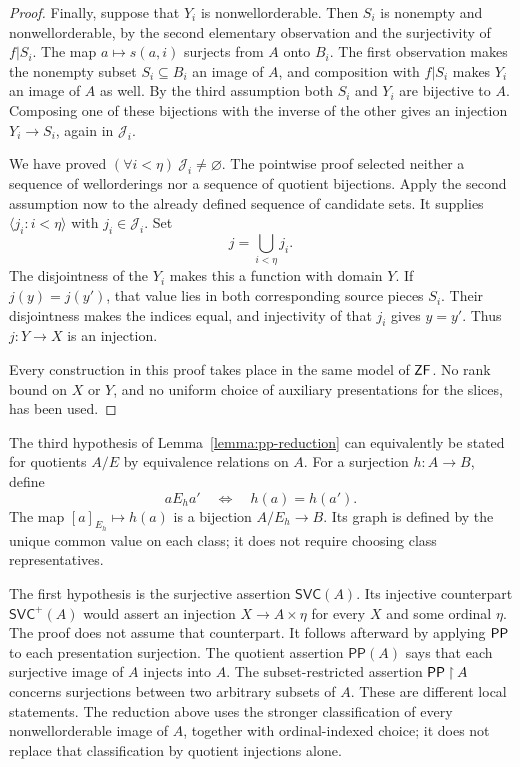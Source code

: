 \begin{proof}
Finally, suppose that $Y_i$ is nonwellorderable.  Then $S_i$ is
nonempty and nonwellorderable, by the second elementary observation
and the surjectivity of $f|S_i$.  The map $a\mapsto s(a,i)$
surjects from $A$ onto $B_i$.  The first observation makes the
nonempty subset $S_i\subseteq B_i$ an image of $A$, and composition
with $f|S_i$ makes $Y_i$ an image of $A$ as well.  By the third
assumption both $S_i$ and $Y_i$ are bijective to $A$.  Composing
one of these bijections with the inverse of the other gives an
injection $Y_i\longrightarrow S_i$, again in $\mathcal J_i$.

We have proved $(\forall i<\eta)\ \mathcal J_i\ne\varnothing$.
The pointwise proof selected neither a sequence of wellorderings nor
a sequence of quotient bijections.  Apply the second assumption now
to the already defined sequence of candidate sets.  It supplies
$\langle j_i:i<\eta\rangle$ with $j_i\in\mathcal J_i$.
Set
\[
 j=\bigcup_{i<\eta}j_i.
\]
The disjointness of the $Y_i$ makes this a function with domain $Y$.
If $j(y)=j(y')$, that value lies in both corresponding source pieces
$S_i$.  Their disjointness makes the indices equal, and injectivity
of that $j_i$ gives $y=y'$.  Thus $j:Y\longrightarrow X$ is an
injection.

Every construction in this proof takes place in the same model of
$\mathsf{ZF}$.  No rank bound on $X$ or $Y$, and no uniform choice of auxiliary
presentations for the slices, has been used.
\end{proof}

\begin{remark}\label{rem:quotients-versus-images}
The third hypothesis of Lemma~\ref{lemma:pp-reduction} can equivalently
be stated for quotients $A/E$ by equivalence relations on $A$.
For a surjection $h:A\longrightarrow B$, define
\[
 a\mathrel{E_h}a'\quad\Longleftrightarrow\quad h(a)=h(a').
\]
The map $[a]_{E_h}\mapsto h(a)$ is a bijection $A/E_h\longrightarrow B$.
Its graph is defined by the unique common value on each class; it
does not require choosing class representatives.

The first hypothesis is the surjective assertion $\mathsf{SVC}(A)$.
Its injective counterpart $\mathsf{SVC}^{+}(A)$ would assert an
injection $X\longrightarrow A\times\eta$ for every $X$ and some
ordinal $\eta$.  The proof does not assume that counterpart.
It follows afterward by applying $\mathsf{PP}$ to each presentation surjection.
The quotient assertion $\mathsf{PP}(A)$ says that each surjective
image of $A$ injects into $A$.  The subset-restricted assertion
$\mathsf{PP}\mathbin{\upharpoonright}A$ concerns surjections between two
arbitrary subsets of $A$.  These are different local statements.
The reduction above uses the stronger classification of every
nonwellorderable image of $A$, together with ordinal-indexed choice;
it does not replace that classification by quotient injections alone.
\end{remark}

